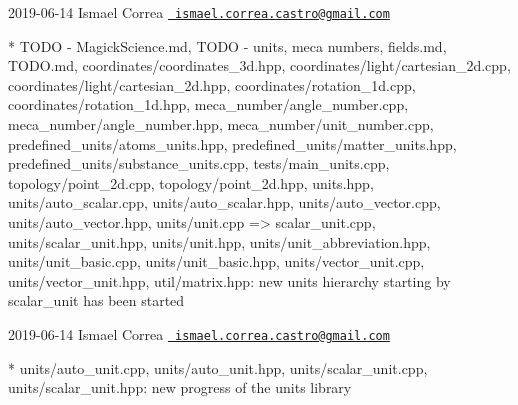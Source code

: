  2019-\/06-\/14 Ismael Correa \href{mailto:ismael.correa.castro@gmail.com}{\texttt{ ismael.\+correa.\+castro@gmail.\+com}} \begin{DoxyVerb}* TODO - MagickScience.md, TODO - units, meca numbers, fields.md,
TODO.md, coordinates/coordinates_3d.hpp,
coordinates/light/cartesian_2d.cpp,
coordinates/light/cartesian_2d.hpp, coordinates/rotation_1d.cpp,
coordinates/rotation_1d.hpp, meca_number/angle_number.cpp,
meca_number/angle_number.hpp, meca_number/unit_number.cpp,
predefined_units/atoms_units.hpp,
predefined_units/matter_units.hpp,
predefined_units/substance_units.cpp, tests/main_units.cpp,
topology/point_2d.cpp, topology/point_2d.hpp, units.hpp,
units/auto_scalar.cpp, units/auto_scalar.hpp,
units/auto_vector.cpp, units/auto_vector.hpp, units/{unit.cpp =>
scalar_unit.cpp}, units/scalar_unit.hpp, units/unit.hpp,
units/unit_abbreviation.hpp, units/unit_basic.cpp,
units/unit_basic.hpp, units/vector_unit.cpp, units/vector_unit.hpp,
util/matrix.hpp: new units hierarchy starting by scalar_unit has
been started
\end{DoxyVerb}
 2019-\/06-\/14 Ismael Correa \href{mailto:ismael.correa.castro@gmail.com}{\texttt{ ismael.\+correa.\+castro@gmail.\+com}} \begin{DoxyVerb}* units/auto_unit.cpp, units/auto_unit.hpp, units/scalar_unit.cpp,
units/scalar_unit.hpp: new progress of the units library
\end{DoxyVerb}
